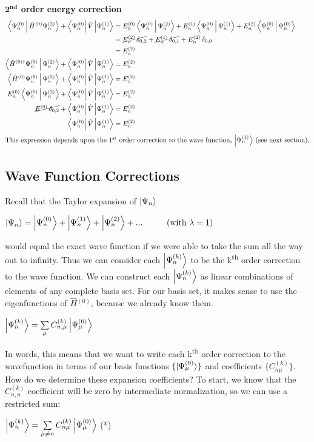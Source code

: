 \documentclass{article}
\newcommand{\suml}{\ensuremath{\sum\limits}}
\newcommand{\z}{\ensuremath{^{(0)}}}
\newcommand{\one}{\ensuremath{^{(1)}}}
\newcommand{\two}{\ensuremath{^{(2)}}}
\newcommand{\no}{\ensuremath{\cancel}}
\newcommand{\tss}{\textsuperscript}
\begin{document}
{\bf $\mathbf{2^{\text{nd}}}$  order energy correction}
\begin{align*}
\Braket{\Psi \z_n | \hat{H}\z \Psi \two_n} + \Bra{\Psi\z_n} \hat{V} \Ket{\Psi\one_n} &=  E\z_n\Braket{\Psi\z_n | \Psi\two_n}  + E\one_n \Braket{\Psi\z_n | \Psi\one_n} + E\two_n \Braket{\Psi\z_n | \Psi\z_n} \\
&=  \no{E\two_n \, \delta_{0,2}}  +  \no{E\one_n \, \delta_{0,1}} + E\two_n\,  \delta_{0,0} \\
&=  E\two_n \\
\Braket{\hat{H}^{(0)\dagger} \Psi \z_n |\Psi \two_n} + \Bra{\Psi\z_n} \hat{V} \Ket{\Psi\one_n} &= E\two_n \\
\Braket{\hat{H}^{(0)} \Psi \z_n |\Psi \two_n} + \Bra{\Psi\z_n} \hat{V} \Ket{\Psi\one_n} &= E\two_n \\
E\z_n \Braket{\Psi \z_n | \Psi \two_n} + \Bra{\Psi\z_n} \hat{V} \Ket{\Psi\one_n} &= E\two_n \\
\no{E\z \, \delta_{0,2}} + \Bra{\Psi\z_n} \hat{V} \Ket{\Psi\one_n} &= E\two_n \\
 \Bra{\Psi\z_n} \hat{V} \Ket{\Psi\one_n} &= E\two_n \\
 \intertext{This expression depends upon the 1$^{\text{st}}$ order correction to the wave function, $\Ket{\Psi\one_n}$ (see next section).}
\end{align*}


\subsection{Wave Function Corrections}
Recall that the Taylor expansion of $\Ket{\Psi_n}$ 
\begin{center}
$\Ket{\Psi_n} = \Ket{\Psi\z_n} + \Ket{\Psi\one_n} + \Ket{\Psi\two_n} + ... \hspace{1cm} \text{(with $\lambda=1$)}  $
\end{center}
would equal the exact wave function if we were able to take the sum all the way out to infinity. Thus we can consider each $\Ket{\Psi^{(k)}_n}$ to be the k\tss{th} order correction to the wave function. We can construct each $\Ket{\Psi^{(k)}_n}$ as linear combinations of elements of any complete basis set. For our basis set, it makes sense to use the eigenfunctions of $\hat{H}\z$, because we already know them. \\
\begin{center}
$\Ket{\Psi^{(k)}_n} = \suml_{\mu} C^{(k)}_{n,\mu} \Ket{\Psi\z_{\mu}} $  
\end{center}
In words, this means that we want to write each k\tss{th} order correction to the wavefunction in terms of our basis functions $\{\ket{\Psi\z_{\mu}}\}$ and coefficients $\{C^{(k)}_{n \mu}\}$. How do we determine these expansion coefficients? To start, we know that the $C^{(k)}_{n, n}$ coefficient will be zero by intermediate normalization, so we can use a restricted sum:
\begin{center}
$\Ket{\Psi^{(k)}_n} = \suml_{\mu \neq n} C^{(k)}_{n \mu} \Ket{\Psi\z_{\mu}}$ \hspace{1cm} (*)
\end{center} 
\end{document}
